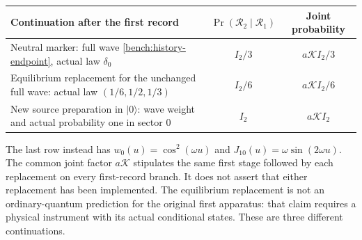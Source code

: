 \documentclass[11pt,oneside,openany]{book}
\theoremstyle{definition}
\theoremstyle{remark}\newtheorem{remark}[theorem]{Remark}
\begin{document}
\begin{center}
\begin{tabularx}{\textwidth}{@{}Xcc@{}}
\toprule
Continuation after the first record
& $\Pr(\mathcal R_2\mid\mathcal R_1)$ & Joint probability\\
\midrule
Neutral marker: full wave \eqref{bench:history-endpoint},
actual law $\delta_0$
& $I_2/3$ & $a\mathcal K I_2/3$\\
Equilibrium replacement for the unchanged full wave:
actual law $(1/6,1/2,1/3)$
& $I_2/6$ & $a\mathcal K I_2/6$\\
New source preparation in $|0\rangle$:
wave weight and actual probability one in sector 0
& $I_2$ & $a\mathcal K I_2$\\
\bottomrule
\end{tabularx}
\end{center}
The last row instead has $w_0(u)=\cos^2(\omega u)$ and
$J_{10}(u)=\omega\sin(2\omega u)$. The common joint factor
$a\mathcal K$ stipulates the same first stage followed by each
replacement on every first-record branch. It does not assert that
either replacement has been implemented. The equilibrium replacement
is not an ordinary-quantum prediction for the original first
apparatus: that claim requires a physical instrument with its actual
conditional states. These are three different continuations.
\end{document}
